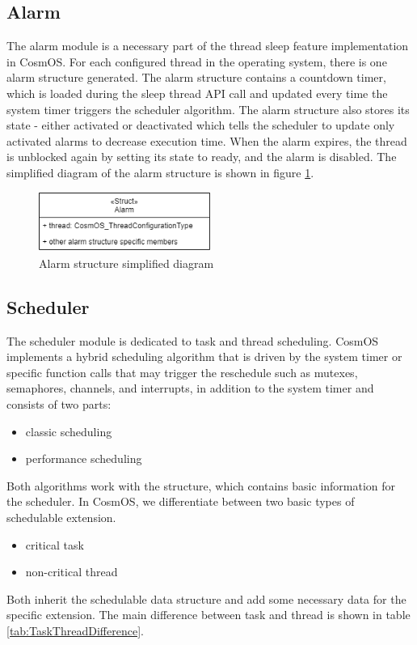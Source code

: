 \subsection{Alarm}\label{alarm}
The alarm module is a necessary part of the thread sleep feature implementation in CosmOS. For each configured thread in the operating system, there is one alarm structure generated. The alarm structure contains a countdown timer, which is loaded during the sleep thread \ac{API} call and updated every time the system timer triggers the scheduler algorithm. The alarm structure also stores its state - either activated or deactivated which tells the scheduler to update only activated alarms to decrease execution time. When the alarm expires, the thread is unblocked again by setting its state to ready, and the alarm is disabled.
The simplified diagram of the alarm structure is shown in figure \ref{fig:alarmStructure}.

\begin{figure}[H]
\begin{center}
\includegraphics[width=0.5\textwidth]{images/alarm_structure.png}
\caption{Alarm structure simplified diagram}
\label{fig:alarmStructure}
\end{center}
\end{figure}

\subsection{Scheduler}
The scheduler module is dedicated to task and thread scheduling. CosmOS implements a hybrid scheduling algorithm that is driven by the system timer or specific function calls that may trigger the reschedule such as mutexes, semaphores, channels, and interrupts, in addition to the system timer and consists of two parts:
\begin{itemize}
\vspace{-0.2cm}\item classic scheduling
\vspace{-0.2cm}\item performance scheduling
\end{itemize}

Both algorithms work with the \textbf{} structure, which contains basic information for the scheduler. In CosmOS, we differentiate between two basic types of schedulable extension.
\begin{itemize}
\vspace{-0.2cm}\item critical task
\vspace{-0.2cm}\item non-critical thread
\end{itemize}
Both inherit the schedulable data structure and add some necessary data for the specific extension. The main difference between task and thread is shown in table \ref{tab:TaskThreadDifference}.


